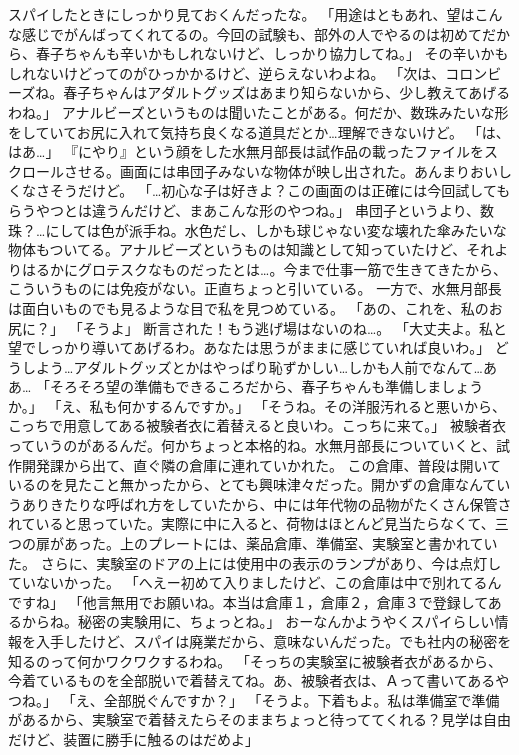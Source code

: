 スパイしたときにしっかり見ておくんだったな。
「用途はともあれ、望はこんな感じでがんばってくれてるの。今回の試験も、部外の人でやるのは初めてだから、春子ちゃんも辛いかもしれないけど、しっかり協力してね。」
その辛いかもしれないけどってのがひっかかるけど、逆らえないわよね。
「次は、コロンビーズね。春子ちゃんはアダルトグッズはあまり知らないから、少し教えてあげるわね。」
アナルビーズというものは聞いたことがある。何だか、数珠みたいな形をしていてお尻に入れて気持ち良くなる道具だとか…理解できないけど。
「は、はあ…」
『にやり』という顔をした水無月部長は試作品の載ったファイルをスクロールさせる。画面には串団子みないな物体が映し出された。あんまりおいしくなさそうだけど。
「…初心な子は好きよ？この画面のは正確には今回試してもらうやつとは違うんだけど、まあこんな形のやつね。」
串団子というより、数珠？…にしては色が派手ね。水色だし、しかも球じゃない変な壊れた傘みたいな物体もついてる。アナルビーズというものは知識として知っていたけど、それよりはるかにグロテスクなものだったとは…。今まで仕事一筋で生きてきたから、こういうものには免疫がない。正直ちょっと引いている。
一方で、水無月部長は面白いものでも見るような目で私を見つめている。
「あの、これを、私のお尻に？」
「そうよ」
断言された！もう逃げ場はないのね…。
「大丈夫よ。私と望でしっかり導いてあげるわ。あなたは思うがままに感じていれば良いわ。」
どうしよう…アダルトグッズとかはやっぱり恥ずかしい…しかも人前でなんて…ああ…
「そろそろ望の準備もできるころだから、春子ちゃんも準備しましょうか。」
「え、私も何かするんですか。」
「そうね。その洋服汚れると悪いから、こっちで用意してある被験者衣に着替えると良いわ。こっちに来て。」
被験者衣っていうのがあるんだ。何かちょっと本格的ね。水無月部長についていくと、試作開発課から出て、直ぐ隣の倉庫に連れていかれた。
この倉庫、普段は開いているのを見たこと無かったから、とても興味津々だった。開かずの倉庫なんていうありきたりな呼ばれ方をしていたから、中には年代物の品物がたくさん保管されていると思っていた。実際に中に入ると、荷物はほとんど見当たらなくて、三つの扉があった。上のプレートには、薬品倉庫、準備室、実験室と書かれていた。
さらに、実験室のドアの上には使用中の表示のランプがあり、今は点灯していないかった。
「へえー初めて入りましたけど、この倉庫は中で別れてるんですね」
「他言無用でお願いね。本当は倉庫１，倉庫２，倉庫３で登録してあるからね。秘密の実験用に、ちょっとね。」
おーなんかようやくスパイらしい情報を入手したけど、スパイは廃業だから、意味ないんだった。でも社内の秘密を知るのって何かワクワクするわね。
「そっちの実験室に被験者衣があるから、今着ているものを全部脱いで着替えてね。あ、被験者衣は、Ａって書いてあるやつね。」
「え、全部脱ぐんですか？」
「そうよ。下着もよ。私は準備室で準備があるから、実験室で着替えたらそのままちょっと待っててくれる？見学は自由だけど、装置に勝手に触るのはだめよ」
